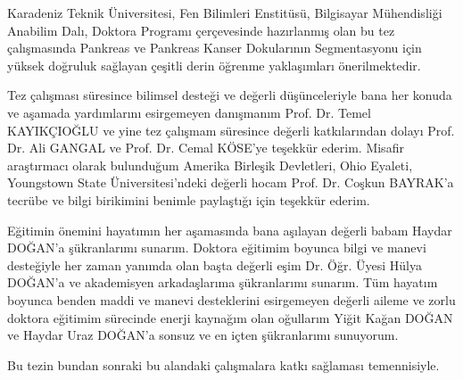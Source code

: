 



\clearpage

\ifnum{}
	\coverpageMS 
	\titlepageMS 
	\signaturepageMS
\else 
	\coverpagePhD   
	\titlepagePhD    
	\signaturepagePhD
\fi

\begin{onsoz}
\indent\indent Karadeniz Teknik Üniversitesi, Fen Bilimleri Enstitüsü, Bilgisayar Mühendisliği Anabilim Dalı, Doktora Programı çerçevesinde hazırlanmış olan bu tez çalışmasında Pankreas ve Pankreas Kanser Dokularının Segmentasyonu için yüksek doğruluk sağlayan çeşitli derin öğrenme yaklaşımları önerilmektedir. 

\indent\indent Tez çalışması süresince bilimsel desteği ve değerli düşünceleriyle bana her konuda ve aşamada yardımlarını esirgemeyen danışmanım Prof. Dr. Temel KAYIKÇIOĞLU ve yine tez çalışmam süresince değerli katkılarından dolayı Prof. Dr. Ali GANGAL ve Prof. Dr. Cemal KÖSE’ye teşekkür ederim. Misafir araştırmacı olarak bulunduğum Amerika Birleşik Devletleri, Ohio Eyaleti, Youngstown State Üniversitesi’ndeki değerli hocam Prof. Dr. Coşkun BAYRAK’a tecrübe ve bilgi birikimini benimle paylaştığı için teşekkür ederim.

\indent\indent Eğitimin önemini hayatımın her aşamasında bana aşılayan değerli babam Haydar DOĞAN'a şükranlarımı sunarım. Doktora eğitimim boyunca bilgi ve manevi desteğiyle her zaman yanımda olan başta değerli eşim Dr. Öğr. Üyesi Hülya DOĞAN'a ve akademisyen arkadaşlarıma şükranlarımı sunarım. Tüm hayatım boyunca benden maddi ve manevi desteklerini esirgemeyen değerli aileme ve zorlu doktora eğitimim sürecinde enerji kaynağım olan oğullarım Yiğit Kağan DOĞAN ve Haydar Uraz DOĞAN'a sonsuz ve en içten şükranlarımı sunuyorum.

\indent\indent Bu tezin bundan sonraki bu alandaki çalışmalara katkı sağlaması temennisiyle.
\\ \\
\end{onsoz}


